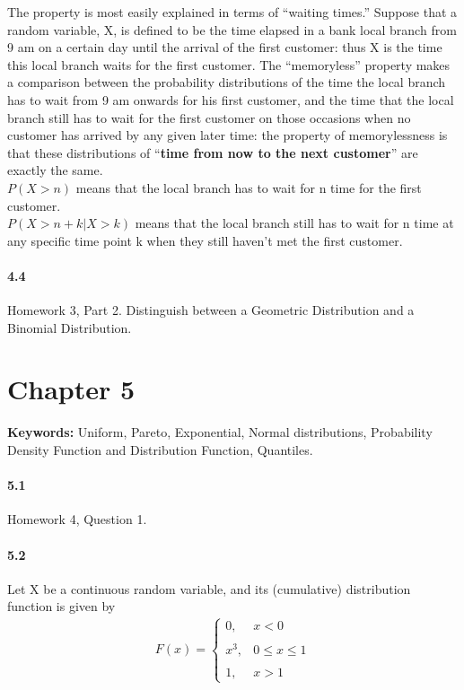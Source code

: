 \documentclass[11pt]{article} %
\begin{document}
The property is most easily explained in terms of ``waiting times.'' Suppose that a random variable, X, is defined to be the time elapsed in a bank local branch from 9 am on a certain day until the arrival of the first customer: thus X is the time this local branch waits for the first customer. The ``memoryless'' property makes a comparison between the probability distributions of the time the local branch has to wait from 9 am onwards for his first customer, and the time that the local branch still has to wait for the first customer on those occasions when no customer has arrived by any given later time: the property of memorylessness is that these distributions of ``{\bf time from now to the next customer}'' are exactly the same. \\
$P(X > n)$ means that the local branch has to wait for n time for the first customer. \\
$P(X > n + k | X > k)$ means that the local branch still has to wait for n time at any specific time point k when they still haven't met the first customer. 


\paragraph*{4.4} Homework 3, Part 2. Distinguish between a Geometric Distribution and a Binomial Distribution. 


\section{Chapter 5}
\textbf{Keywords:} Uniform, Pareto, Exponential, Normal distributions, Probability Density Function and Distribution Function, Quantiles.
\paragraph*{5.1} Homework 4, Question 1.
\paragraph*{5.2} Let X be a continuous random variable, and its (cumulative) distribution function is given by
\begin{align*}
F(x) = \left\lbrace
\begin{array}{ll} 
0, & x < 0 \\
& \\
x^3, & 0 \leq x \leq 1 \\ 
& \\
1, & x > 1
\end{array}
\right.
\end{align*}
\end{document}
